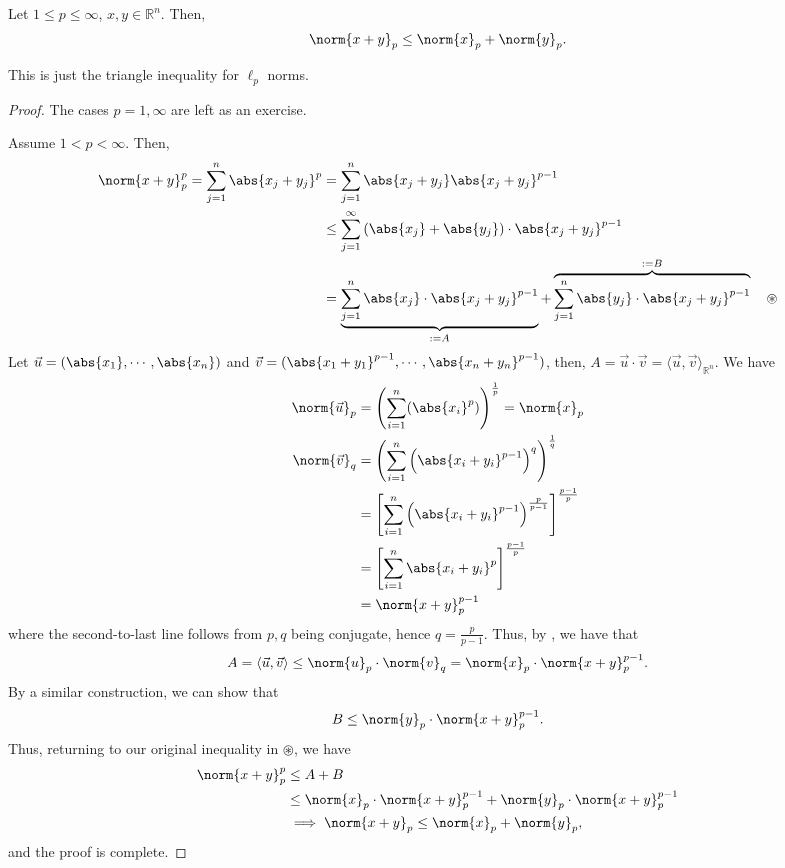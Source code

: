\begin{proposition}
    Let $1 \leq p \leq \infty$, $x, y \in \mathbb{R}^n$. Then, \[
    \norm{x+ y}_p \leq \norm{x}_p + \norm{y}_p.    
    \]
\end{proposition}
\begin{remark}
    This is just the triangle inequality for $\ell_p$ norms.
\end{remark}

\begin{proof}
    The cases $p = 1, \infty$ are left as an exercise. %

    Assume $1 < p < \infty$. Then, \begin{align*}
        \norm{x +y}_p^p = \sum_{j=1}^n \abs{x_j + y_j}^p &= \sum_{j=1}^{n} \abs{x_j + y_j}\abs{x_j + y_j}^{p-1}\\
        &\leq \sum_{j=1}^{\infty} \left(\abs{x_j} + \abs{y_j}\right)\cdot \abs{x_j + y_j}^{p-1} \\
        &= \underbrace{\sum_{j=1}^n \abs{x_j}\cdot \abs{x_j + y_j}^{p-1}}_{:=A} + \overbrace{\sum_{j=1}^n \abs{y_j} \cdot \abs{x_j + y_j}^{p-1}}^{:=B} \quad \circledast
    \end{align*}
    Let $\vec{u} = (\abs{x_1}, \cdots, \abs{x_n})$ and $\vec{v} = (\abs{x_1+y_1}^{p-1}, \cdots, \abs{x_n + y_n}^{{p-1}})$, then, $A = \vec{u} \cdot \vec{v} = \langle \vec{u}, \vec{v}\rangle_{\mathbb{R}^n}$. We have \begin{align*}
        \norm{\vec{u}}_p &= \left(\sum_{i=1}^n (\abs{x_i}^p)\right)^{\frac{1}{p}} = \norm{x}_p\\
        \norm{\vec{v}}_q &= \left(\sum_{i=1}^{n}\left(\abs{x_i + y_i}^{p-1}\right)^q\right)^{\frac{1}{q}}\\
        &= \left[\sum_{i=1}^n \left(\abs{x_i + y_i}^{p-1}\right)^{\frac{p}{p-1}}\right]^{\frac{p-1}{p}}\\
        &= \left[\sum_{i=1}^n \abs{x_i + y_i}^{p}\right]^{\frac{p-1}{p}}\\
        &= \norm{x+y}_p^{p-1}
    \end{align*}
    where the second-to-last line follows from $p, q$ being conjugate, hence $q = \frac{p}{p-1}$. Thus, by , we have that \[
    A = \langle \vec{u}, \vec{v}\rangle \leq \norm{u}_p \cdot \norm{v}_q = \norm{x}_p \cdot \norm{x+y}^{p-1}_p.    
    \]
    By a similar construction, we can show that \[
    B \leq \norm{y}_p \cdot \norm{x+y}^{p-1}_p.   
    \]
    Thus, returning to our original inequality in $\circledast$, we have \begin{align*}
        \norm{x+y}^{p}_p &\leq A + B \\
        &\leq \norm{x}_p\cdot \norm{x+y}^{p-1}_p + \norm{y}_p \cdot \norm{x+y}_p^{p-1}\\
        &\implies \norm{x+y}_p \leq \norm{x}_p + \norm{y}_p,
    \end{align*}
    and the proof is complete.
\end{proof}